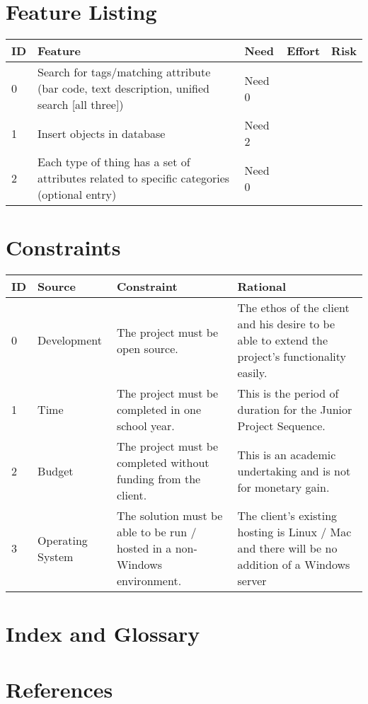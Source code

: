 \documentclass{article}
\begin{document}
\section{Feature Listing}
\begin{tabular}{ | p{0.25in} | p{3.25in} | p{0.5in} | p{0.5in} | p{0.5in} | }
\hline
\textbf{ID} & \textbf{Feature} & \textbf{Need} & \textbf{Effort} & \textbf{Risk}\\
\hline
\hline
0 & Search for tags/matching attribute (bar code, text description, unified search [all three]) & Need 0 &  & \\
\hline
1 & Insert objects in database & Need 2 &  & \\
\hline
2 & Each type of thing has a set of attributes related to specific categories (optional entry) & Need 0 &  & \\
\hline
\end{tabular}

\section{Constraints}
\begin{tabular}{ | p{0.25in} | p{1.15in} | p{2.3in} | p{2.3in} | }
\hline
\textbf{ID} & \textbf{Source} & \textbf{Constraint} & \textbf{Rational}\\
\hline
\hline
0 & Development & The project must be open source. & The ethos of the client and his desire to be able to extend the project's functionality easily.\\
\hline
1 & Time & The project must be completed in one school year. & This is the period of duration for the Junior Project Sequence.\\
\hline
2 & Budget & The project must be completed without funding from the client. & This is an academic undertaking and is not for monetary gain.\\
\hline
3 & Operating System & The solution must be able to be run / hosted in a non-Windows environment. & The client's existing hosting is Linux / Mac and there will be no addition of a Windows server\\
\hline
\end{tabular}

\section{Index and Glossary}

\section{References}
\end{document}
